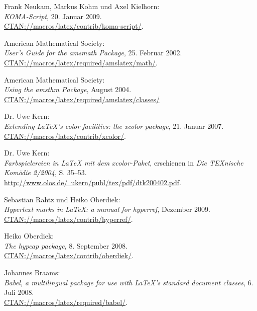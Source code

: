 \documentclass{exercise}
\begin{document}
  \begin{thebibliography}{22}
     Frank Neukam, Markus Kohm und Axel Kielhorn: \\
    \emph{KOMA-Script}, 20. Januar 2009. \\
    \href{http://mirror.ctan.org/macros/latex/contrib/koma-script/}{CTAN://macros/latex/contrib/koma-script/}.
  
     American Mathematical Society: \\
    \emph{User's Guide for the amsmath Package}, 25. Februar 2002. \\
    \href{http://mirror.ctan.org/macros/latex/required/amslatex/math/}{CTAN://macros/latex/required/amslatex/math/}.
  
     American Mathematical Society: \\
    \emph{Using the amsthm Package}, August 2004. \\
    \href{http://mirror.ctan.org/macros/latex/required/amslatex/classes/}{CTAN://macros/latex/required/amslatex/classes/}
  
     Dr. Uwe Kern: \\
    \emph{Extending \LaTeX's color facilities: the xcolor package}, 21. Januar 2007. \\
    \href{http://mirror.ctan.org/macros/latex/contrib/xcolor/}{CTAN://macros/latex/contrib/xcolor/}.
    
     Dr. Uwe Kern: \\
    \emph{Farbspielereien in \LaTeX{} mit dem xcolor-Paket}, erschienen in \emph{Die TEXnische Komödie 2/2004}, S. 35–53. \\
    \href{http://www.olos.de/~ukern/publ/tex/pdf/dtk200402.pdf}{http://www.olos.de/~ukern/publ/tex/pdf/dtk200402.pdf}.
    
     Sebastian Rahtz und Heiko Oberdiek: \\
    \emph{Hypertext marks in \LaTeX{}: a manual for hyperref}, Dezember 2009. \\
    \href{http://mirror.ctan.org/macros/latex/contrib/hyperref/}{CTAN://macros/latex/contrib/hyperref/}.
    
     Heiko Oberdiek: \\
    \emph{The hypcap package}, 8. September 2008. \\
    \href{http://mirror.ctan.org/macros/latex/contrib/oberdiek/}{CTAN://macros/latex/contrib/oberdiek/}.
    
     Johannes Braams: \\
    \emph{Babel, a multilingual package for use with \LaTeX{}'s standard document classes}, 6. Juli 2008. \\
    \href{http://mirror.ctan.org/macros/latex/required/babel/}{CTAN://macros/latex/required/babel/}.
    

\end{thebibliography}
\end{document}

